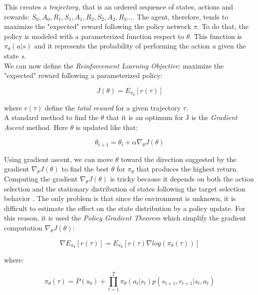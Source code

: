 This creates a \textsl{trajectory}, that is an ordered sequence of states, actions and rewards: $S_{0}, A_{0}, R_{1}, S_{1}, A_{1}, R_{2}, S_{2}, A_{2}, R_{3} \dots$.
The agent, therefore, tends to maximize the "expected" reward following the policy network $\pi$. To do that, the policy is modeled with a parameterized function respect to $\theta$. This function is  $\pi_{\theta}(a|s)$ and it represents the probability of performing the action \textit{a} given the state \textit{s}. \\ 
We can now define the \textsl{Reinforcement Learning Objective}: maximize the "expected" reward following a parameterized policy:

\begin{equation}
    J(\theta) = E_{\pi_{\theta}} [r(\tau)]
\end{equation}

where $r(\tau)$ define the \textsl{total reward} for a given trajectory $\tau$. \\
A standard method to find the $\theta$ that it is an optimum for J is the \textsl{Gradient Ascent} method. Here $\theta$ is updated like that:

\begin{equation}
    \theta_{t+1} = \theta_{t} + \alpha\nabla_{\theta} J(\theta)
\end{equation}

Using gradient ascent, we can move $\theta$ toward the direction suggested by the gradient $\nabla_{\theta}J(\theta)$ to find the best $\theta$ for $\pi_{\theta}$ that produces the highest return. Computing the gradient $\nabla_{\theta}J(\theta)$ is tricky because it depends on both the action selection and the stationary distribution of states following the target selection behavior \cite{gradient}. The only problem is that since the environment is unknown, it is difficult to estimate the effect on the state distribution by a policy update.
For this reason, it is used the \textsl{Policy Gradient Theorem} which simplify the gradient computation  $\nabla_{\theta}J(\theta)$:

\begin{equation}\label{eq:nablae}
    \nabla E_{\pi_{\theta}}[r(\tau)] = E_{\pi_{\theta}}[r(\tau)\nabla log(\pi_{\theta}(\tau))]
\end{equation}

where:

\begin{equation}\label{eq:pitau}
    \pi_{\theta}(\tau) = P(s_{0}) + \prod_{t=1}^{T} \pi_{\theta}(a_{t}|s_{t})p(s_{t+1}, r_{t+1} | s_{t}, a_{t})
\end{equation}

